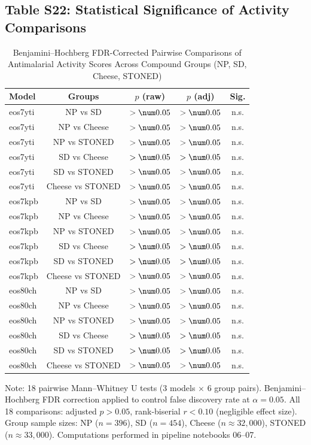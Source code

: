 \subsection*{Table S22: Statistical Significance of Activity Comparisons}

\begin{table}[h]
\centering
\caption{Benjamini--Hochberg FDR-Corrected Pairwise Comparisons of Antimalarial Activity Scores Across Compound Groups (NP, SD, Cheese, STONED)}
\label{tab:sm_s22_bh_correction}
\scriptsize
\begin{tabular}{@{}l c c c c@{}}
\toprule
\textbf{Model} & \textbf{Groups} & \textbf{$p$ (raw)} & \textbf{$p$ (adj)} & \textbf{Sig.} \\
\midrule
eos7yti & NP vs SD & $> \num0.05$ & $> \num0.05$ & n.s. \\
eos7yti & NP vs Cheese & $> \num0.05$ & $> \num0.05$ & n.s. \\
eos7yti & NP vs STONED & $> \num0.05$ & $> \num0.05$ & n.s. \\
eos7yti & SD vs Cheese & $> \num0.05$ & $> \num0.05$ & n.s. \\
eos7yti & SD vs STONED & $> \num0.05$ & $> \num0.05$ & n.s. \\
eos7yti & Cheese vs STONED & $> \num0.05$ & $> \num0.05$ & n.s. \\
eos7kpb & NP vs SD & $> \num0.05$ & $> \num0.05$ & n.s. \\
eos7kpb & NP vs Cheese & $> \num0.05$ & $> \num0.05$ & n.s. \\
eos7kpb & NP vs STONED & $> \num0.05$ & $> \num0.05$ & n.s. \\
eos7kpb & SD vs Cheese & $> \num0.05$ & $> \num0.05$ & n.s. \\
eos7kpb & SD vs STONED & $> \num0.05$ & $> \num0.05$ & n.s. \\
eos7kpb & Cheese vs STONED & $> \num0.05$ & $> \num0.05$ & n.s. \\
eos80ch & NP vs SD & $> \num0.05$ & $> \num0.05$ & n.s. \\
eos80ch & NP vs Cheese & $> \num0.05$ & $> \num0.05$ & n.s. \\
eos80ch & NP vs STONED & $> \num0.05$ & $> \num0.05$ & n.s. \\
eos80ch & SD vs Cheese & $> \num0.05$ & $> \num0.05$ & n.s. \\
eos80ch & SD vs STONED & $> \num0.05$ & $> \num0.05$ & n.s. \\
eos80ch & Cheese vs STONED & $> \num0.05$ & $> \num0.05$ & n.s. \\
\bottomrule
\end{tabular}
\end{table}

\begin{footnotesize}
Note: 18 pairwise Mann--Whitney U tests (3 models $\times$ 6 group pairs).
Benjamini--Hochberg FDR correction applied to control false discovery rate at $\alpha = 0.05$.
All 18 comparisons: adjusted $p > 0.05$, rank-biserial $r < 0.10$ (negligible effect size).
Group sample sizes: NP ($n = 396$), SD ($n = 454$), Cheese ($n \approx 32{,}000$), STONED ($n \approx 33{,}000$).
Computations performed in pipeline notebooks 06--07.
\end{footnotesize}